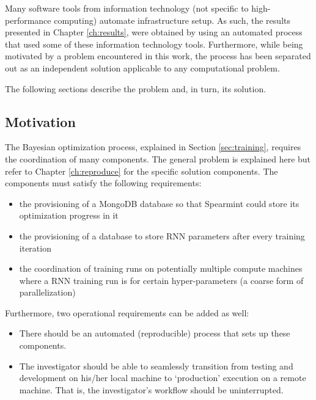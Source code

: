 Many software tools from information technology (not specific to high-performance computing) automate infrastructure setup.
%
As such, the results presented in Chapter \ref{ch:results}, were obtained by using an automated process that used some of these information technology tools.
%
Furthermore, while being motivated by a problem encountered in this work, the process has been separated out as an independent solution applicable to any computational problem.


The following sections describe the problem and, in turn, its solution.


\subsection{Motivation}
\label{sec:pccmotivation}

The Bayesian optimization process, explained in Section \ref{sec:training}, requires the coordination of many components.
%
The general problem is explained here but refer to Chapter \ref{ch:reproduce} for the specific solution components.
%
The components must satisfy the following requirements:
%
\begin{itemize}

\item 
  the provisioning of a \textsf{MongoDB} database so that \textsf{Spearmint} could store its optimization progress in it

\item
  the provisioning of a database to store RNN parameters after every training iteration

\item
  the coordination of training runs on potentially multiple compute machines where a RNN training run is for certain hyper-parameters (a coarse form of parallelization)

\end{itemize}

Furthermore, two operational requirements can be added as well:

\begin{itemize}

\item
  There should be an automated (reproducible) process that sets up these components.

\item
  The investigator should be able to seamlessly transition from testing and development on his/her local machine to `production' execution on a remote machine.
%
That is, the investigator's workflow should be uninterrupted.

\end{itemize}


